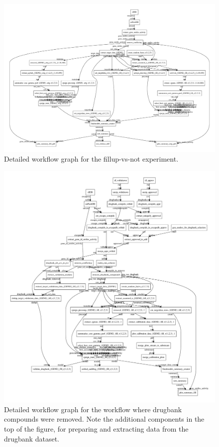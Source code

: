 \documentclass[10pt,article]{memoir}
\begin{document}
\begin{figure}[h!]
\includegraphics[width=\textwidth]{figures/workflow_graph_fillup_vs_not.pdf}
    \caption{Detailed workflow graph for the fillup-vs-not experiment.}
    \label{fig:workflow_detailed_fillup_vs_not}
\end{figure}

\begin{figure}[h!]
\includegraphics[width=\textwidth]{figures/workflow_graph_wo_drugbank.pdf}
    \caption{Detailed workflow graph for the workflow where drugbank compounds
    were removed. Note the additional components in the top of the figure, for
    preparing and extracting data from the drugbank dataset.}
    \label{fig:workflow_detailed_wo_drugbank}
\end{figure}
\end{document}
